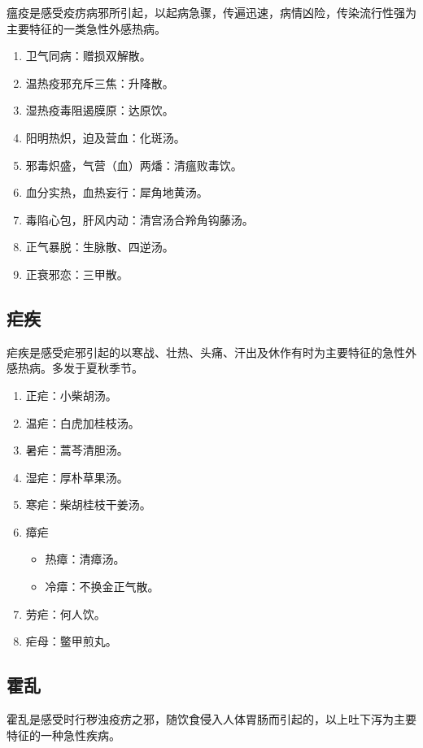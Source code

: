 \documentclass[cn,black,12pt,founder,normal,twocolumn]{elegantnote}
\begin{document}
瘟疫是感受疫疠病邪所引起，以起病急骤，传遍迅速，病情凶险，传染流行性强为主要特征的一类急性外感热病。

\begin{enumerate}
    \item 卫气同病：赠损双解散。
    \item 温热疫邪充斥三焦：升降散。
    \item 湿热疫毒阻遏膜原：达原饮。
    \item 阳明热炽，迫及营血：化斑汤。
    \item 邪毒炽盛，气营（血）两燔：清瘟败毒饮。
    \item 血分实热，血热妄行：犀角地黄汤。
    \item 毒陷心包，肝风内动：清宫汤合羚角钩藤汤。
    \item 正气暴脱：生脉散、四逆汤。
    \item 正衰邪恋：三甲散。
\end{enumerate}

\subsection{疟疾}

疟疾是感受疟邪引起的以寒战、壮热、头痛、汗出及休作有时为主要特征的急性外感热病。多发于夏秋季节。

\begin{enumerate}
    \item 正疟：小柴胡汤。
    \item 温疟：白虎加桂枝汤。
    \item 暑疟：蒿芩清胆汤。
    \item 湿疟：厚朴草果汤。
    \item 寒疟：柴胡桂枝干姜汤。
    \item 瘴疟
    \begin{itemize}
        \item 热瘴：清瘴汤。
        \item 冷瘴：不换金正气散。
    \end{itemize}
    \item 劳疟：何人饮。
    \item 疟母：鳖甲煎丸。
\end{enumerate}

\subsection{霍乱}

霍乱是感受时行秽浊疫疠之邪，随饮食侵入人体胃肠而引起的，以上吐下泻为主要特征的一种急性疾病。
\end{document}
